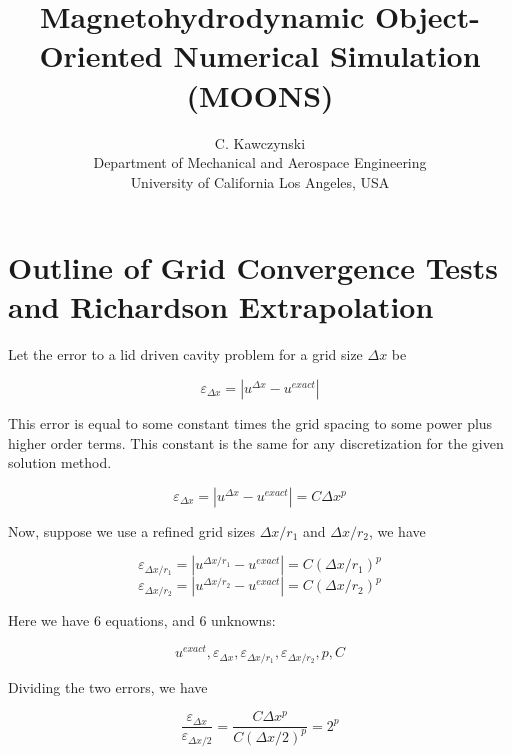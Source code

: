 \documentclass[11pt]{article}
\begin{document}
\doublespacing
\title{Magnetohydrodynamic Object-Oriented Numerical Simulation (MOONS)}
\author{C. Kawczynski \\
Department of Mechanical and Aerospace Engineering \\
University of California Los Angeles, USA\\
}
\maketitle

\section{Outline of Grid Convergence Tests and Richardson Extrapolation}

Let the error to a lid driven cavity problem for a grid size $\Delta x$ be

\begin{equation}
	\varepsilon_{\Delta x} = |u^{\Delta x} - u^{exact}|
\end{equation}

This error is equal to some constant times the grid spacing to some power plus higher order terms. This constant is the same for any discretization for the given solution method.

\begin{equation}
	\varepsilon_{\Delta x} = |u^{\Delta x} - u^{exact}| = C \Delta x^p
\end{equation}

Now, suppose we use a refined grid sizes $\Delta x/r_1$ and $\Delta x/r_2$, we have

\begin{equation}
	\varepsilon_{\Delta x/r_1} = |u^{\Delta x/r_1} - u^{exact}| = C (\Delta x/r_1)^p
\end{equation}
\begin{equation}
	\varepsilon_{\Delta x/r_2} = |u^{\Delta x/r_2} - u^{exact}| = C (\Delta x/r_2)^p
\end{equation}

Here we have 6 equations, and 6 unknowns:

\begin{equation}
	u^{exact}, 
	\varepsilon_{\Delta x} , 
	\varepsilon_{\Delta x/r_1} , 
	\varepsilon_{\Delta x/r_2} , 
	p , 
	C
\end{equation}

Dividing the two errors, we have

\begin{equation}
	\frac{\varepsilon_{\Delta x}}{\varepsilon_{\Delta x/2}}
	=
	\frac{C \Delta x^p}{C (\Delta x/2)^p}
	=
	2^p
\end{equation}
\end{document}
